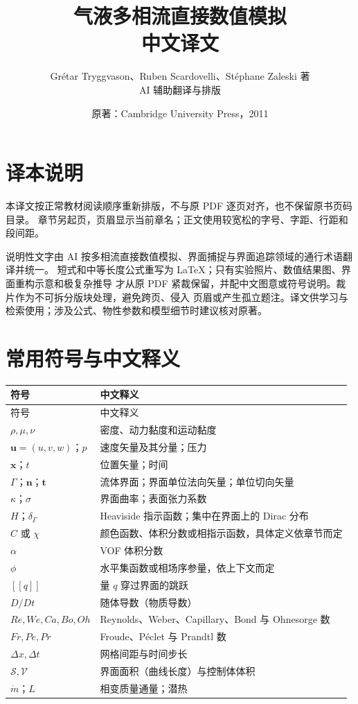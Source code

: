 \documentclass[11pt,a4paper,openany,fontset=none]{ctexbook}
\title{气液多相流直接数值模拟\\[0.65em]\large 中文译文}
\author{Grétar Tryggvason、Ruben Scardovelli、Stéphane Zaleski 著\\
\small AI 辅助翻译与排版}
\date{原著：Cambridge University Press，2011}
\begin{document}
\frontmatter
\maketitle
\chapter*{译本说明}
本译文按正常教材阅读顺序重新排版，不与原 PDF 逐页对齐，也不保留原书页码目录。
章节另起页，页眉显示当前章名；正文使用较宽松的字号、字距、行距和段间距。

说明性文字由 AI 按多相流直接数值模拟、界面捕捉与界面追踪领域的通行术语翻译并统一。
短式和中等长度公式重写为 LaTeX；只有实验照片、数值结果图、界面重构示意和极复杂推导
才从原 PDF 紧裁保留，并配中文图意或符号说明。裁片作为不可拆分版块处理，避免跨页、侵入
页眉或产生孤立题注。译文供学习与检索使用；涉及公式、物性参数和模型细节时建议核对原著。

\begingroup\small\tableofcontents\endgroup

\chapter*{常用符号与中文释义}
\begingroup\small
\renewcommand{\arraystretch}{1.20}
\begin{longtable}{>{\centering\arraybackslash}p{}p{}}
\toprule 符号 & 中文释义 \\ \midrule
\endfirsthead
\toprule 符号 & 中文释义 \\ \midrule
\endhead
$\rho,\mu,\nu$ & 密度、动力黏度和运动黏度 \\
$\bm u=(u,v,w)$；$p$ & 速度矢量及其分量；压力 \\
$\bm x$；$t$ & 位置矢量；时间 \\
$\Gamma$；$\bm n$；$\bm t$ & 流体界面；界面单位法向矢量；单位切向矢量 \\
$\kappa$；$\sigma$ & 界面曲率；表面张力系数 \\
$H$；$\delta_\Gamma$ & Heaviside 指示函数；集中在界面上的 Dirac 分布 \\
$C$ 或 $\chi$ & 颜色函数、体积分数或相指示函数，具体定义依章节而定 \\
$\alpha$ & VOF 体积分数 \\
$\phi$ & 水平集函数或相场序参量，依上下文而定 \\
$[\![q]\!]$ & 量 $q$ 穿过界面的跳跃 \\
$D/Dt$ & 随体导数（物质导数） \\
$Re,We,Ca,Bo,Oh$ & Reynolds、Weber、Capillary、Bond 与 Ohnesorge 数 \\
$Fr,Pe,Pr$ & Froude、Péclet 与 Prandtl 数 \\
$\Delta x,\Delta t$ & 网格间距与时间步长 \\
$\mathcal S,\mathcal V$ & 界面面积（曲线长度）与控制体体积 \\
$\dot m$；$L$ & 相变质量通量；潜热 \\
\bottomrule
\end{longtable}
\endgroup
\end{document}
